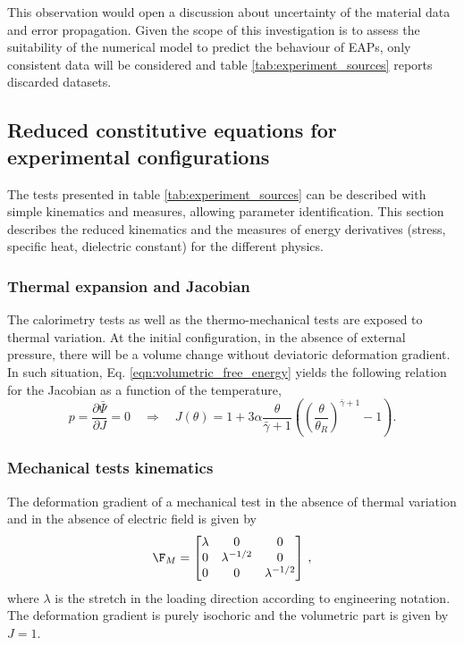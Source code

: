 This observation would open a discussion about uncertainty of the material data and error propagation. Given the scope of this investigation is to assess the suitability of the numerical model to predict the behaviour of EAPs, only consistent data will be considered and table \ref{tab:experiment_sources} reports discarded datasets.



\subsection{Reduced constitutive equations for experimental configurations}

The tests presented in table \ref{tab:experiment_sources} can be described with simple kinematics and measures, allowing parameter identification. This section describes the reduced kinematics and the measures of energy derivatives (stress, specific heat, dielectric constant) for the different physics.


\subsubsection{Thermal expansion and Jacobian}
The calorimetry tests as well as the thermo-mechanical tests are exposed to thermal variation. At the initial configuration, in the absence of external pressure, there will be a volume change without deviatoric deformation gradient.
In such situation, Eq. \eqref{eqn:volumetric_free_energy} yields the following relation for the Jacobian as a function of the temperature,
\begin{equation} \label{eqn:thermal_Jacobian}
    p = \frac{\partial\bar\Psi}{\partial J} = 0 \quad\Longrightarrow\quad
    J(\theta) = 1 + 3\alpha\frac{\theta}{\bar\gamma+1}
    \left(\left(\frac{\theta}{\theta_R}\right)^{\bar\gamma+1} - 1\right).
\end{equation}


\subsubsection{Mechanical tests kinematics}
The deformation gradient of a mechanical test in the absence of thermal variation and in the absence of electric field is given by
\begin{equation}
  \F_M = \begin{bmatrix}
    \lambda & 0 & 0 \\
    0 & \lambda^{-1/2} & 0 \\
    0 & 0 & \lambda^{-1/2} \\
  \end{bmatrix} \,,
\end{equation}
where $\lambda$ is the stretch in the loading direction according to engineering notation. The deformation gradient is purely isochoric and the volumetric part is given by $J=1$.


